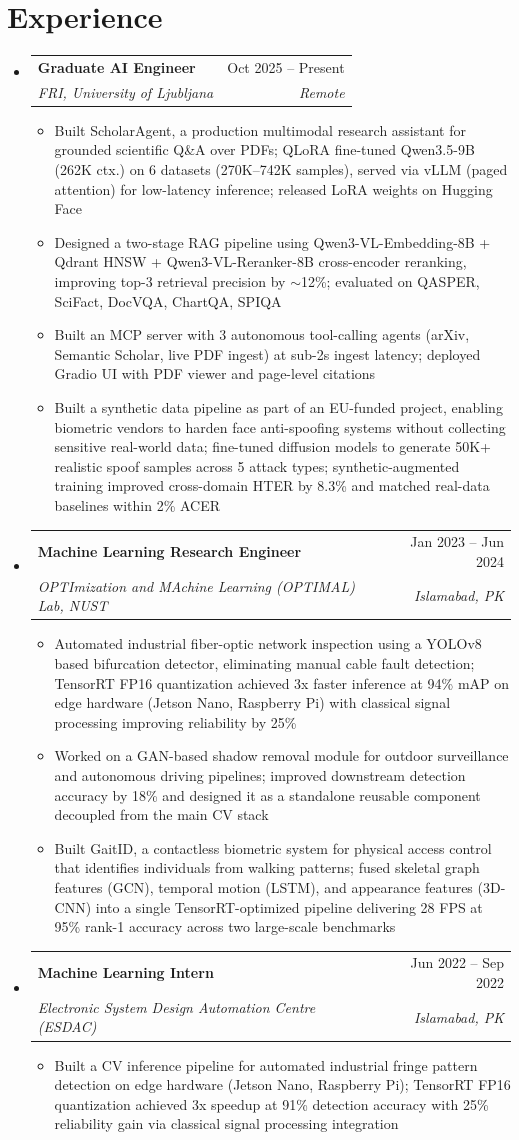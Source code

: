 \documentclass[letterpaper,11pt]{article}
\makeatletter
\newcommand{\resumeItem}[1]{
  \item\small{
    {#1 \vspace{-2pt}}
  }
}
\newcommand{\resumeSubheading}[4]{
  \vspace{-1pt}\item
    \begin{tabular*}{0.97\textwidth}[t]{l@{\extracolsep{\fill}}r}
      \textbf{#1} & #2 \\
      \textit{\small#3} & \textit{\small #4} \\
    \end{tabular*}\vspace{-7pt}
}
\newcommand{\resumeSubHeadingListStart}{\begin{itemize}[leftmargin=0.15in, label={}]}
\newcommand{\resumeSubHeadingListEnd}{\end{itemize}}
\newcommand{\resumeItemListStart}{\begin{itemize}}
\newcommand{\resumeItemListEnd}{\end{itemize}\vspace{-5pt}}
\makeatother
\begin{document}
\section{Experience}
  \resumeSubHeadingListStart
\resumeSubheading
  {Graduate AI Engineer}{Oct 2025 -- Present}
  {FRI, University of Ljubljana}{Remote}
      \resumeItemListStart
        \resumeItem{Built ScholarAgent, a production multimodal research assistant for grounded scientific Q\&A over PDFs; QLoRA fine-tuned Qwen3.5-9B (262K ctx.) on 6 datasets (270K--742K samples), served via vLLM (paged attention) for low-latency inference; released LoRA weights on Hugging Face}
        \resumeItem{Designed a two-stage RAG pipeline using Qwen3-VL-Embedding-8B + Qdrant HNSW + Qwen3-VL-Reranker-8B cross-encoder reranking, improving top-3 retrieval precision by ${\sim}$12\%; evaluated on QASPER, SciFact, DocVQA, ChartQA, SPIQA}
        \resumeItem{Built an MCP server with 3 autonomous tool-calling agents (arXiv, Semantic Scholar, live PDF ingest) at sub-2s ingest latency; deployed Gradio UI with PDF viewer and page-level citations}
        \resumeItem{Built a synthetic data pipeline as part of an EU-funded project, enabling biometric vendors to harden face anti-spoofing systems without collecting sensitive real-world data; fine-tuned diffusion models to generate 50K+ realistic spoof samples across 5 attack types; synthetic-augmented training improved cross-domain HTER by 8.3\% and matched real-data baselines within 2\% ACER}
      \resumeItemListEnd
    \resumeSubheading
      {Machine Learning Research Engineer}{Jan 2023 -- Jun 2024}
      {OPTImization and MAchine Learning (OPTIMAL) Lab, NUST}{Islamabad, PK}
      \resumeItemListStart
        \resumeItem{Automated industrial fiber-optic network inspection using a YOLOv8 based bifurcation detector, eliminating manual cable fault detection; TensorRT FP16 quantization achieved 3x faster inference at 94\% mAP on edge hardware (Jetson Nano, Raspberry Pi) with classical signal processing improving reliability by 25\%}
        \resumeItem{Worked on a GAN-based shadow removal module for outdoor surveillance and autonomous driving pipelines; improved downstream detection accuracy by 18\% and designed it as a standalone reusable component decoupled from the main CV stack}
        \resumeItem{Built GaitID, a contactless biometric system for physical access control that identifies individuals from walking patterns; fused skeletal graph features (GCN), temporal motion (LSTM), and appearance features (3D-CNN) into a single TensorRT-optimized pipeline delivering 28 FPS at 95\% rank-1 accuracy across two large-scale benchmarks}
      \resumeItemListEnd
    \resumeSubheading
      {Machine Learning Intern}{Jun 2022 -- Sep 2022}
      {Electronic System Design Automation Centre (ESDAC)}{Islamabad, PK}
      \resumeItemListStart
        \resumeItem{Built a CV inference pipeline for automated industrial fringe pattern detection on edge hardware (Jetson Nano, Raspberry Pi); TensorRT FP16 quantization achieved 3x speedup at 91\% detection accuracy with 25\% reliability gain via classical signal processing integration}
      \resumeItemListEnd
  \resumeSubHeadingListEnd
\end{document}
